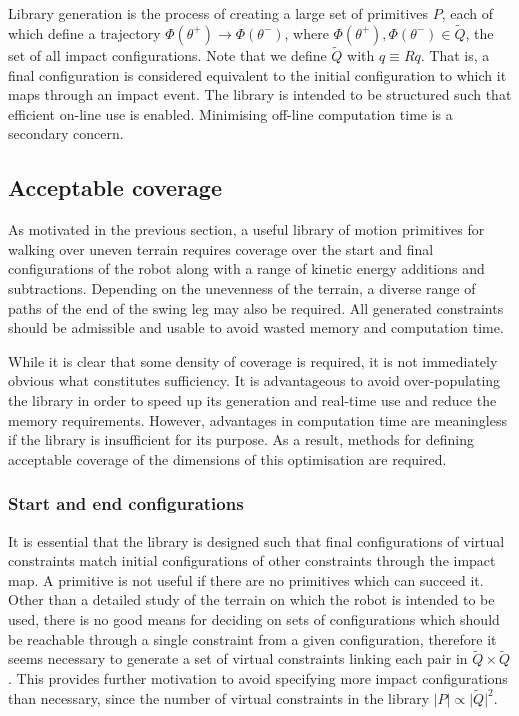 Library generation is the process of creating a large set of primitives $P$, each of which define a trajectory $\Phi(\theta^+) \to \Phi(\theta^-)$, where $\Phi(\theta^+), \Phi(\theta^-) \in \tilde{Q}$, the set of all impact configurations. Note that we define $\tilde{Q}$ with $q\equiv Rq$. That is, a final configuration is considered equivalent to the initial configuration to which it maps through an impact event. The library is intended to be structured such that efficient on-line use is enabled. Minimising off-line computation time is a secondary concern.

\subsection{Acceptable coverage}
As motivated in the previous section, a useful library of motion primitives for walking over uneven terrain requires coverage over the start and final configurations of the robot along with a range of kinetic energy additions and subtractions. Depending on the unevenness of the terrain, a diverse range of paths of the end of the swing leg may also be required. All generated constraints should be admissible and usable to avoid wasted memory and computation time.

While it is clear that some density of coverage is required, it is not immediately obvious what constitutes sufficiency. It is advantageous to avoid over-populating the library in order to speed up its generation and real-time use and reduce the memory requirements. However, advantages in computation time are meaningless if the library is insufficient for its purpose. As a result, methods for defining acceptable coverage of the dimensions of this optimisation are required.

\subsubsection{Start and end configurations}
It is essential that the library is designed such that final configurations of virtual constraints match initial configurations of other constraints through the impact map. A primitive is not useful if there are no primitives which can succeed it. Other than a detailed study of the terrain on which the robot is intended to be used, there is no good means for deciding on sets of configurations which should be reachable through a single constraint from a given configuration, therefore it seems necessary to generate a set of virtual constraints linking each pair in $\tilde{Q}\times\tilde{Q}$. This provides further motivation to avoid specifying more impact configurations than necessary, since the number of virtual constraints in the library $\lvert P \rvert \propto \lvert\tilde{Q}\rvert^2$.

